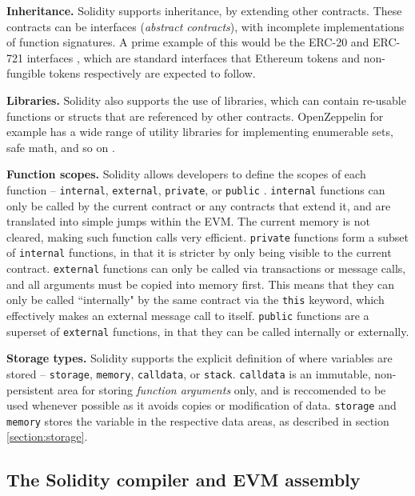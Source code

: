 \textbf{Inheritance.} Solidity supports inheritance, by extending other contracts. These contracts can be interfaces (\textit{abstract contracts}),
with incomplete implementations of function signatures. A prime example of this would be the ERC-20
and ERC-721 interfaces \cite{etherc20} \cite{etherc721}, which are standard interfaces that Ethereum 
tokens and non-fungible tokens respectively are expected to follow. 

\textbf{Libraries.} Solidity also supports the
use of libraries, which can contain re-usable functions or structs that are referenced by other
contracts. OpenZeppelin for example has a wide range of utility libraries for implementing enumerable sets,
safe math, and so on \cite{openzeppelincontracts}.

\textbf{Function scopes.} Solidity allows developers to define the scopes of each function --
\texttt{internal}, \texttt{external}, \texttt{private}, or \texttt{public} \cite{soliditydocsscope}. 
\texttt{internal} functions can only be called by the current contract or any contracts that
extend it, and are translated into simple jumps within the EVM. The current memory is not cleared,
making such function calls very efficient. \texttt{private} functions form a subset of
\texttt{internal} functions, in that it is stricter by only being visible to the current contract.
\texttt{external} functions can only be called via transactions or message calls,
and all arguments must be copied into memory first. This means that they can only be called
``internally" by the same contract via the \texttt{this} keyword, which effectively makes an 
external message call to itself. \texttt{public} functions are a superset of \texttt{external} functions,
in that they can be called internally or externally.

\textbf{Storage types.} Solidity supports the explicit definition of where variables are stored -- 
\texttt{storage}, \texttt{memory}, \texttt{calldata}, or \texttt{stack}. \texttt{calldata} is
an immutable, non-persistent area for storing \textit{function arguments} only, and is
reccomended to be used whenever possible as it avoids copies or modification of data.
\texttt{storage} and \texttt{memory} stores the variable in the respective data areas, 
as described in section \ref{section:storage}. 


\subsection{The Solidity compiler and EVM assembly}

